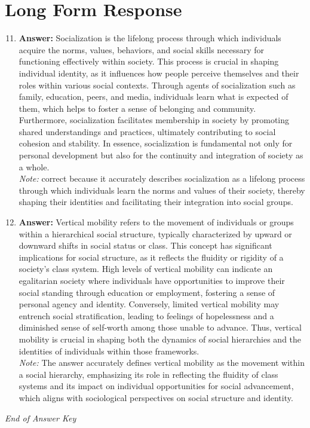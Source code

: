 \documentclass[12pt]{article}
\begin{document}
\section*{Long Form Response}
\begin{enumerate}[label=\arabic*.]
\setcounter{enumi}{10}
\item \textbf{Answer:} Socialization is the lifelong process through which individuals acquire the norms, values, behaviors, and social skills necessary for functioning effectively within society. This process is crucial in shaping individual identity, as it influences how people perceive themselves and their roles within various social contexts. Through agents of socialization such as family, education, peers, and media, individuals learn what is expected of them, which helps to foster a sense of belonging and community. Furthermore, socialization facilitates membership in society by promoting shared understandings and practices, ultimately contributing to social cohesion and stability. In essence, socialization is fundamental not only for personal development but also for the continuity and integration of society as a whole.
\\ \textit{Note:} correct because it accurately describes socialization as a lifelong process through which individuals learn the norms and values of their society, thereby shaping their identities and facilitating their integration into social groups.
\item \textbf{Answer:} Vertical mobility refers to the movement of individuals or groups within a hierarchical social structure, typically characterized by upward or downward shifts in social status or class. This concept has significant implications for social structure, as it reflects the fluidity or rigidity of a society's class system. High levels of vertical mobility can indicate an egalitarian society where individuals have opportunities to improve their social standing through education or employment, fostering a sense of personal agency and identity. Conversely, limited vertical mobility may entrench social stratification, leading to feelings of hopelessness and a diminished sense of self-worth among those unable to advance. Thus, vertical mobility is crucial in shaping both the dynamics of social hierarchies and the identities of individuals within those frameworks.
\\ \textit{Note:} The answer accurately defines vertical mobility as the movement within a social hierarchy, emphasizing its role in reflecting the fluidity of class systems and its impact on individual opportunities for social advancement, which aligns with sociological perspectives on social structure and identity.
\end{enumerate}

\vfill
\noindent\textit{End of Answer Key}
\end{document}
